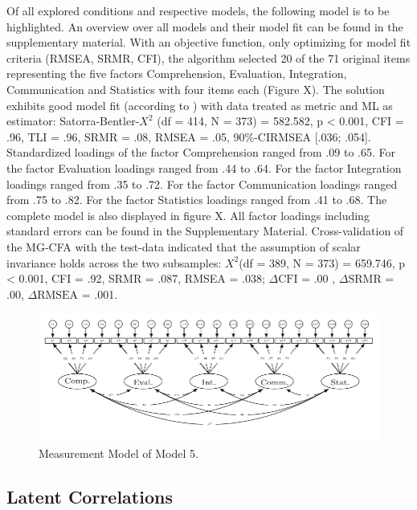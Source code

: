 \documentclass[
  12pt,
  a4paper,
  twoside]{article}
\begin{document}
Of all explored conditions and respective models, the following model is to be highlighted. An overview over all models and their model fit can be found in the supplementary material.
With an objective function, only optimizing for model fit criteria (RMSEA, SRMR, CFI), the algorithm selected 20 of the 71 original items representing the five factors Comprehension, Evaluation, Integration, Communication and Statistics with four items each (Figure X). The solution exhibits good model fit (according to ) with data treated as metric and ML as estimator: Satorra-Bentler-\(X^{2}\) (df = 414, N = 373) = 582.582, p \textless{} 0.001, CFI = .96, TLI = .96, SRMR = .08, RMSEA = .05, 90\%-CIRMSEA {[}.036; .054{]}.
Standardized loadings of the factor Comprehension ranged from .09 to .65. For the factor Evaluation loadings ranged from .44 to .64. For the factor Integration loadings ranged from .35 to .72. For the factor Communication loadings ranged from .75 to .82. For the factor Statistics loadings ranged from .41 to .68. The complete model is also displayed in figure X.
All factor loadings including standard errors can be found in the Supplementary Material.
Cross-validation of the MG-CFA with the test-data indicated that the assumption of scalar invariance holds across the two subsamples: \(X^{2}\)(df = 389, N = 373) = 659.746, p \textless{} 0.001, CFI = .92, SRMR = .087, RMSEA = .038; \(\Delta\text{CFI}\) = .00 , \(\Delta\text{SRMR}\) = .00, \(\Delta\text{RMSEA}\) = .001.

\begin{figure}

{\centering \includegraphics[width=1\linewidth]{images/Model5} 

}

\caption{Measurement Model of Model 5.  }\label{fig:model3}
\end{figure}

\subsection{Latent Correlations}\label{latent-correlations}
\end{document}

